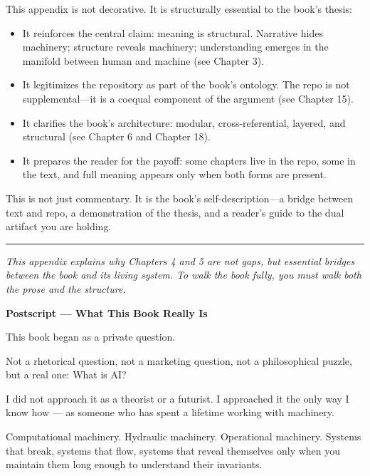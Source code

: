 This appendix is not decorative. It is structurally essential to the
book's thesis:

\begin{itemize}
\tightlist
\item
  It reinforces the central claim: meaning is structural. Narrative
  hides machinery; structure reveals machinery; understanding emerges in
  the manifold between human and machine (see Chapter 3).
\item
  It legitimizes the repository as part of the book's ontology. The repo
  is not supplemental---it is a coequal component of the argument (see
  Chapter 15).
\item
  It clarifies the book's architecture: modular, cross-referential,
  layered, and structural (see Chapter 6 and Chapter 18).
\item
  It prepares the reader for the payoff: some chapters live in the repo,
  some in the text, and full meaning appears only when both forms are
  present.
\end{itemize}

This is not just commentary. It is the book's self-description---a
bridge between text and repo, a demonstration of the thesis, and a
reader's guide to the dual artifact you are holding.

\begin{center}\rule{0.5\linewidth}{0.5pt}\end{center}

\emph{This appendix explains why Chapters 4 and 5 are not gaps, but
essential bridges between the book and its living system. To walk the
book fully, you must walk both the prose and the structure.}

\newpage
\vspace*{4cm}
\begin{center}
{\large\textbf{Postscript — What This Book Really Is}}
\end{center}

This book began as a private question.

Not a rhetorical question, not a marketing question, not a philosophical
puzzle, but a real one: What is AI?

I did not approach it as a theorist or a futurist. I approached it the
only way I know how --- as someone who has spent a lifetime working with
machinery.

Computational machinery. Hydraulic machinery. Operational machinery.
Systems that break, systems that flow, systems that reveal themselves
only when you maintain them long enough to understand their invariants.

